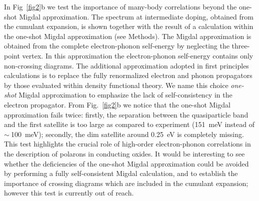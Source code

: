 \documentclass[12pt]{nature}
\begin{document}
In Fig~\ref{fig2}b we test the importance of many-body correlations beyond the one-shot Migdal 
approximation. The spectrum at intermediate doping, obtained from the cumulant expansion, 
is shown together with the result of a calculation within the one-shot Migdal approximation 
(see Methods). The Migdal approximation is obtained from the complete electron-phonon self-energy by 
neglecting the three-point vertex\cite{Mahan}. In this approximation the electron-phonon self-energy 
contains only non-crossing diagrams. The additional approximation adopted in first principles 
calculations is to replace the fully renormalized  electron and phonon propagators by those evaluated 
within density functional theory\cite{GiustinoRMP}. We name this choice \textit{one-shot} Migdal
approximation to emphasize the lack of self-consistency in the electron propagator. From Fig.~\ref{fig2}b 
we notice that the one-shot Migdal approximation fails twice: firstly, the separation between the 
quasiparticle band and the first satellite is too large as compared to experiment (151~meV instead 
of $\sim\:$100~meV); secondly, the dim satellite around 0.25~eV is completely missing. This test highlights 
the crucial role of high-order electron-phonon correlations in the description of polarons in conducting 
oxides. It would be interesting to see whether the deficiencies of the one-shot Migdal approximation 
could be avoided by performing a fully self-consistent Migdal calculation,\cite{Marsiglio1990} and to 
establish the importance of crossing diagrams which are included in the cumulant expansion; however 
this test is currently out of reach.
\end{document}
